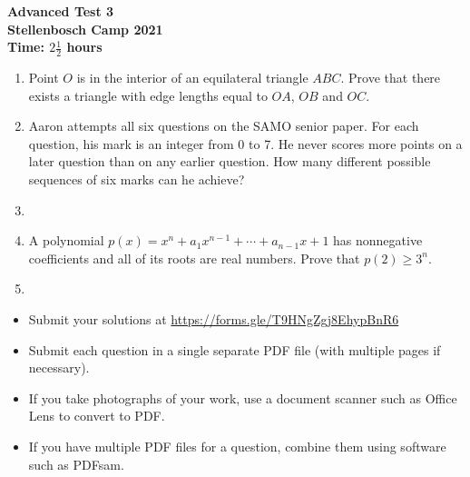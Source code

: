 \documentclass{article}
\begin{document}
\thispagestyle{empty}

\begin{center}
  \textbf{\Large Advanced Test 3}
  \\ \vspace{1em}
  \textbf{\large Stellenbosch Camp 2021}
  \\ \vspace{1em}
  \textbf{\large Time: $2\frac{1}{2}$ hours}
\end{center}

\bigskip

\begin{enumerate}[itemsep=\fill]

\item %
Point $O$ is in the interior of an equilateral triangle $ABC$. Prove that there exists a triangle with edge lengths equal to $OA$, $OB$ and $OC$.

\item %
Aaron attempts all six questions on the SAMO senior paper. For each question, his mark is an integer from 0 to 7. He never scores more points on a later question than on any earlier question. How many different possible sequences of six marks can he achieve? 


\item %


\item %
A polynomial $p(x) = x^n +a_1 x^{n-1} +\dotsb +a_{n-1} x +1$ has nonnegative coefficients and all of its roots are real numbers.
Prove that $p(2) \geq 3^n$.


\item %

\end{enumerate}


\vfill
\begin{itemize}
	\item Submit your solutions at \href{https://forms.gle/T9HNgZgj8EhypBnR6}{https://forms.gle/T9HNgZgj8EhypBnR6}
	\item Submit each question in a single separate PDF file (with multiple pages if necessary).
	\item If you take photographs of your work, use a document scanner such as Office Lens to convert to PDF.
	\item If you have multiple PDF files for a question, combine them using software such as PDFsam.
\end{itemize}
\end{document}
